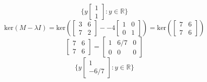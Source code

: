 \documentclass[hidelinks]{article}
\begin{document}
\[
	\{ y\begin{bmatrix} 1 \\ 1 \end{bmatrix} : y\in \mathbb{R}\}
\]
\[
	\text{ker}(M - \lambda I) = \text{ker}(\begin{bmatrix} 3 & 6 \\ 7 & 2 \end{bmatrix} - -4\begin{bmatrix} 1 & 0 \\ 0 & 1 \end{bmatrix}) = \text{ker}(\begin{bmatrix} 7 & 6 \\ 7 & 6 \end{bmatrix})
\]
\[
	\begin{bmatrix} 7 & 6 \\ 7 & 6 \end{bmatrix}= \begin{bmatrix} 1 & 6/7 & 0\\ 0 & 0 & 0 \end{bmatrix}\]
\[
	\{ y\begin{bmatrix} 1 \\ -6/7 \end{bmatrix} : y\in \mathbb{R}\}
\]
\end{document}

